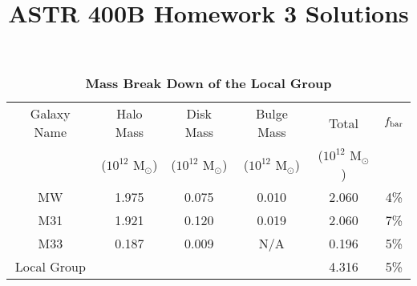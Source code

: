 \documentclass[12pt]{article}
\title{ASTR 400B Homework 3 Solutions}
\date{}
\begin{document}
\maketitle


\begin{table}[h]
\centering
\caption{ {\bf Mass Break Down of the Local Group} }
\label{table:Masses}
\begin{tabular}{ |c|c|c|c|c|c| }
\hline\hline
Galaxy Name &  Halo Mass & Disk Mass & Bulge Mass & Total & $f_{\rm bar}$\\   
	    &  ($10^{12}$ M$_\odot$)   & ($10^{12}$ M$_\odot$)  & ($10^{12}$ M$_\odot$) & ($10^{12}$ M$_\odot$) &  \\
\hline
MW  &  1.975  &  0.075 & 0.010 & 2.060  & 4\% \\
M31 &  1.921 & 0.120 & 0.019 & 2.060 & 7\% \\
M33 &  0.187  &  0.009  &  N/A & 0.196 &  5\% \\
\hline
Local Group &  &  &  &  4.316  &   5\% \\
\hline\hline
\end{tabular}
\end{table}
\end{document}
